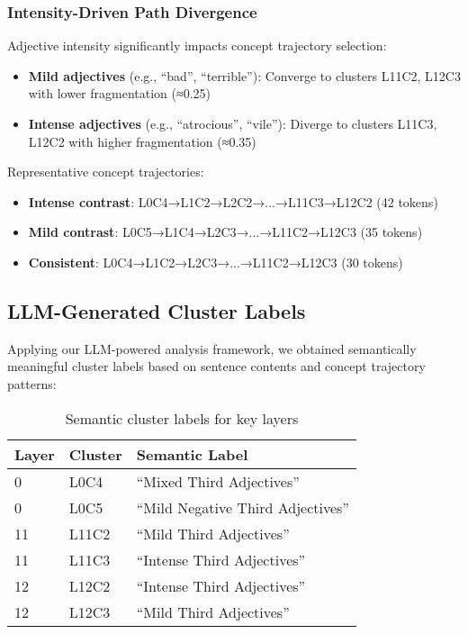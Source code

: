\subsubsection{Intensity-Driven Path Divergence}

Adjective intensity significantly impacts concept trajectory selection:

\begin{itemize}
    \item \textbf{Mild adjectives} (e.g., ``bad'', ``terrible''): Converge to clusters L11C2, L12C3 with lower fragmentation (≈0.25)
    \item \textbf{Intense adjectives} (e.g., ``atrocious'', ``vile''): Diverge to clusters L11C3, L12C2 with higher fragmentation (≈0.35)
\end{itemize}

Representative concept trajectories:
\begin{itemize}
    \item \textbf{Intense contrast}: L0C4→L1C2→L2C2→...→L11C3→L12C2 (42 tokens)
    \item \textbf{Mild contrast}: L0C5→L1C4→L2C3→...→L11C2→L12C3 (35 tokens)  
    \item \textbf{Consistent}: L0C4→L1C2→L2C3→...→L11C2→L12C3 (30 tokens)
\end{itemize}

\subsection{LLM-Generated Cluster Labels}

Applying our LLM-powered analysis framework, we obtained semantically meaningful cluster labels based on sentence contents and concept trajectory patterns:

\begin{table}[h!]
\centering
\caption{Semantic cluster labels for key layers}
\label{tab:gpt2_cluster_labels}
\begin{tabular}{lll}
\toprule
Layer & Cluster & Semantic Label \\
\midrule
0 & L0C4 & ``Mixed Third Adjectives'' \\
0 & L0C5 & ``Mild Negative Third Adjectives'' \\
11 & L11C2 & ``Mild Third Adjectives'' \\  
11 & L11C3 & ``Intense Third Adjectives'' \\
12 & L12C2 & ``Intense Third Adjectives'' \\
12 & L12C3 & ``Mild Third Adjectives'' \\
\bottomrule
\end{tabular}
\end{table}

